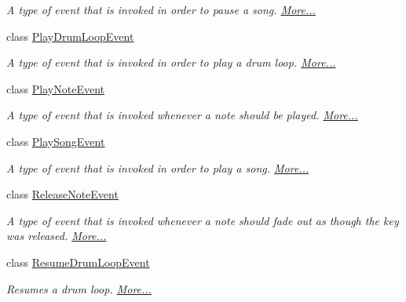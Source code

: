 \begin{DoxyCompactItemize}
\begin{DoxyCompactList}\small\item\em A type of event that is invoked in order to pause a song.  \hyperlink{group___v_i_m_event_types_class_virtual_instrument_manager_1_1_pause_song_event}{More...}\end{DoxyCompactList}\item 
class \hyperlink{group___v_i_m_event_types_class_virtual_instrument_manager_1_1_play_drum_loop_event}{Play\+Drum\+Loop\+Event}
\begin{DoxyCompactList}\small\item\em A type of event that is invoked in order to play a drum loop.  \hyperlink{group___v_i_m_event_types_class_virtual_instrument_manager_1_1_play_drum_loop_event}{More...}\end{DoxyCompactList}\item 
class \hyperlink{group___v_i_m_event_types_class_virtual_instrument_manager_1_1_play_note_event}{Play\+Note\+Event}
\begin{DoxyCompactList}\small\item\em A type of event that is invoked whenever a note should be played.  \hyperlink{group___v_i_m_event_types_class_virtual_instrument_manager_1_1_play_note_event}{More...}\end{DoxyCompactList}\item 
class \hyperlink{group___v_i_m_event_types_class_virtual_instrument_manager_1_1_play_song_event}{Play\+Song\+Event}
\begin{DoxyCompactList}\small\item\em A type of event that is invoked in order to play a song.  \hyperlink{group___v_i_m_event_types_class_virtual_instrument_manager_1_1_play_song_event}{More...}\end{DoxyCompactList}\item 
class \hyperlink{group___v_i_m_event_types_class_virtual_instrument_manager_1_1_release_note_event}{Release\+Note\+Event}
\begin{DoxyCompactList}\small\item\em A type of event that is invoked whenever a note should fade out as though the key was released.  \hyperlink{group___v_i_m_event_types_class_virtual_instrument_manager_1_1_release_note_event}{More...}\end{DoxyCompactList}\item 
class \hyperlink{group___v_i_m_event_types_class_virtual_instrument_manager_1_1_resume_drum_loop_event}{Resume\+Drum\+Loop\+Event}
\begin{DoxyCompactList}\small\item\em Resumes a drum loop.  \hyperlink{group___v_i_m_event_types_class_virtual_instrument_manager_1_1_resume_drum_loop_event}{More...}\end{DoxyCompactList}\item 

\end{DoxyCompactItemize}
